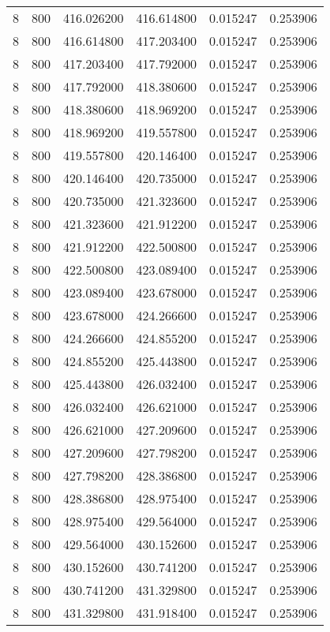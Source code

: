 \begin{longtable}{rrrrrr}
8 & 800 & 416.026200 & 416.614800 & 0.015247 & 0.253906 \\
8 & 800 & 416.614800 & 417.203400 & 0.015247 & 0.253906 \\
8 & 800 & 417.203400 & 417.792000 & 0.015247 & 0.253906 \\
8 & 800 & 417.792000 & 418.380600 & 0.015247 & 0.253906 \\
8 & 800 & 418.380600 & 418.969200 & 0.015247 & 0.253906 \\
8 & 800 & 418.969200 & 419.557800 & 0.015247 & 0.253906 \\
8 & 800 & 419.557800 & 420.146400 & 0.015247 & 0.253906 \\
8 & 800 & 420.146400 & 420.735000 & 0.015247 & 0.253906 \\
8 & 800 & 420.735000 & 421.323600 & 0.015247 & 0.253906 \\
8 & 800 & 421.323600 & 421.912200 & 0.015247 & 0.253906 \\
8 & 800 & 421.912200 & 422.500800 & 0.015247 & 0.253906 \\
8 & 800 & 422.500800 & 423.089400 & 0.015247 & 0.253906 \\
8 & 800 & 423.089400 & 423.678000 & 0.015247 & 0.253906 \\
8 & 800 & 423.678000 & 424.266600 & 0.015247 & 0.253906 \\
8 & 800 & 424.266600 & 424.855200 & 0.015247 & 0.253906 \\
8 & 800 & 424.855200 & 425.443800 & 0.015247 & 0.253906 \\
8 & 800 & 425.443800 & 426.032400 & 0.015247 & 0.253906 \\
8 & 800 & 426.032400 & 426.621000 & 0.015247 & 0.253906 \\
8 & 800 & 426.621000 & 427.209600 & 0.015247 & 0.253906 \\
8 & 800 & 427.209600 & 427.798200 & 0.015247 & 0.253906 \\
8 & 800 & 427.798200 & 428.386800 & 0.015247 & 0.253906 \\
8 & 800 & 428.386800 & 428.975400 & 0.015247 & 0.253906 \\
8 & 800 & 428.975400 & 429.564000 & 0.015247 & 0.253906 \\
8 & 800 & 429.564000 & 430.152600 & 0.015247 & 0.253906 \\
8 & 800 & 430.152600 & 430.741200 & 0.015247 & 0.253906 \\
8 & 800 & 430.741200 & 431.329800 & 0.015247 & 0.253906 \\
8 & 800 & 431.329800 & 431.918400 & 0.015247 & 0.253906 \\

\end{longtable}
